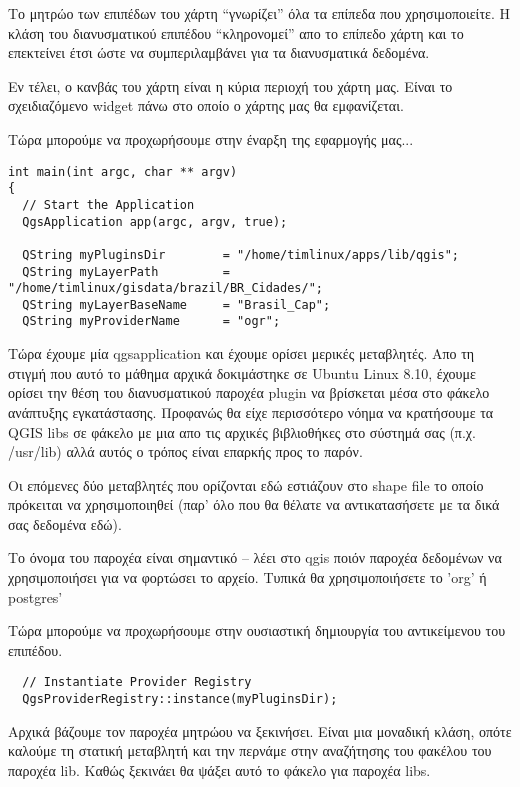 Το μητρώο των επιπέδων του χάρτη “γνωρίζει” όλα τα επίπεδα που χρησιμοποιείτε. Η κλάση του διανυσματικού επιπέδου “κληρονομεί” απο το επίπεδο χάρτη και το επεκτείνει έτσι ώστε να συμπεριλαμβάνει για τα διανυσματικά δεδομένα. 

Εν τέλει, ο κανβάς του χάρτη είναι η κύρια περιοχή του χάρτη μας. Είναι το σχειδιαζόμενο widget πάνω στο οποίο ο χάρτης μας θα εμφανίζεται.

Τώρα μπορούμε να προχωρήσουμε στην έναρξη της εφαρμογής μας...

\begin{verbatim}
int main(int argc, char ** argv)
{
  // Start the Application
  QgsApplication app(argc, argv, true);

  QString myPluginsDir        = "/home/timlinux/apps/lib/qgis";
  QString myLayerPath         = "/home/timlinux/gisdata/brazil/BR_Cidades/";
  QString myLayerBaseName     = "Brasil_Cap";
  QString myProviderName      = "ogr";

\end{verbatim}

Τώρα έχουμε μία  qgsapplication και έχουμε ορίσει μερικές μεταβλητές. Απο τη στιγμή που αυτό το μάθημα αρχικά δοκιμάστηκε σε Ubuntu Linux 8.10, έχουμε ορίσει την θέση του διανυσματικού παροχέα plugin να βρίσκεται μέσα στο φάκελο ανάπτυξης εγκατάστασης. Προφανώς θα είχε περισσότερο νόημα να κρατήσουμε τα QGIS libs σε φάκελο με μια απο τις αρχικές βιβλιοθήκες στο σύστημά σας (π.χ. /usr/lib) αλλά αυτός ο τρόπος είναι επαρκής προς το παρόν. 

Οι επόμενες δύο μεταβλητές που ορίζονται εδώ εστιάζουν στο shape file το οποίο πρόκειται να χρησιμοποιηθεί (παρ' όλο που θα θέλατε να αντικατασήσετε με τα δικά σας δεδομένα εδώ). 

Το όνομα του παροχέα είναι σημαντικό – λέει στο qgis ποιόν παροχέα δεδομένων να χρησιμοποιήσει για να φορτώσει το αρχείο. Τυπικά θα χρησιμοποιήσετε το 'org' ή postgres'

Τώρα μπορούμε να προχωρήσουμε στην ουσιαστική δημιουργία του αντικείμενου του επιπέδου.

\begin{verbatim}
  // Instantiate Provider Registry
  QgsProviderRegistry::instance(myPluginsDir);
\end{verbatim}

Αρχικά βάζουμε τον παροχέα μητρώου να ξεκινήσει. Είναι μια μοναδική κλάση, οπότε καλούμε τη στατική μεταβλητή και την περνάμε στην αναζήτησης του φακέλου του παροχέα lib. Καθώς ξεκινάει θα ψάξει αυτό το φάκελο για παροχέα libs.

